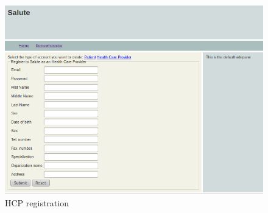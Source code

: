\begin{figure}
\includegraphics[scale=0.6]{screenshots/HCP_register.png}
\caption{HCP registration}
\end{figure}

